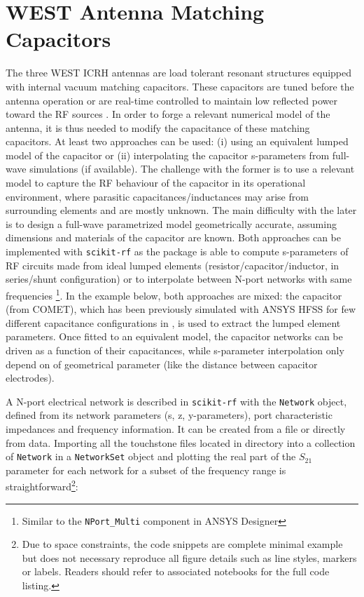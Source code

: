 \documentclass[%
aip,
cp,  %
amsmath,amssymb,%
reprint,%
]{revtex4-2}
\begin{document}
	\section{WEST Antenna Matching Capacitors}
	The three WEST ICRH antennas are load tolerant resonant structures equipped with internal vacuum matching capacitors. These capacitors are tuned before the antenna operation or are real-time controlled to maintain low reflected power toward the RF sources \cite{Hillairet2015}. In order to forge a relevant numerical model of the antenna, it is thus needed to modify the capacitance of these matching capacitors. At least two approaches can be used: (i) using an equivalent lumped model of the capacitor or (ii) interpolating the capacitor s-parameters from full-wave simulations (if available). The challenge with the former is to use a relevant model to capture the RF behaviour of the capacitor in its operational environment, where parasitic capacitances/inductances may arise from surrounding elements and are mostly unknown. The main difficulty with the later is to design a full-wave parametrized model geometrically accurate, assuming dimensions and materials of the capacitor are known. Both approaches can be implemented with \texttt{scikit-rf} as the package is able to compute s-parameters of RF circuits made from ideal lumped elements (resistor/capacitor/inductor, in series/shunt configuration)  or to interpolate between N-port networks with same frequencies \footnote{Similar to the \texttt{NPort\_Multi} component in ANSYS Designer}. In the example below, both approaches are mixed: the capacitor (from COMET), which has been previously simulated with ANSYS HFSS for few different capacitance configurations in \cite{Helou2018PhD}, is used to extract the lumped element parameters. Once fitted to an equivalent model, the capacitor networks can be driven as a function of their capacitances, while s-parameter interpolation only depend on of geometrical parameter (like the distance between capacitor electrodes).
	
	A N-port electrical network is described in \texttt{scikit-rf} with the \texttt{Network} object, defined from its network parameters (s, z, y-parameters),
	port characteristic impedances and frequency information. It can be created from a file or directly from data. Importing all the touchstone files located in directory into a collection of \texttt{Network} in a \texttt{NetworkSet} object and plotting the real part of the $S_{21}$ parameter for each network for a subset of the frequency range is straightforward\footnote{Due to space constraints, the code snippets are complete minimal example but does not necessary reproduce all figure details such as line styles, markers or labels. Readers should refer to associated notebooks for the full code listing.}:
	
\end{document}

